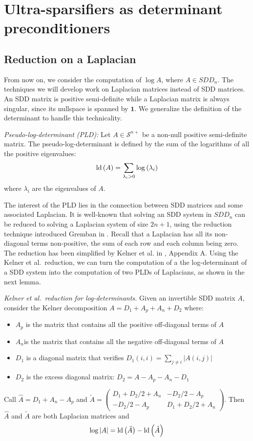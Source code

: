 
\section{Ultra-sparsifiers as determinant preconditioners}


\subsection{Reduction on a Laplacian}

\label{sec:Making-the-problem}

From now on, we consider the computation of $\log A$, where $A\in SDD_{n}$.
The techniques we will develop work on Laplacian matrices instead
of SDD matrices. An SDD matrix is positive semi-definite while a Laplacian
matrix is always singular, since its nullspace is spanned by $\mathbf{1}$.
We generalize the definition of the determinant to handle this technicality.
\begin{definition}
\emph{Pseudo-log-determinant (PLD):} Let $A\in\mathcal{S}^{n+}$ be
a non-null positive semi-definite matrix. The pseudo-log-determinant
is defined by the sum of the logarithms of all the positive eigenvalues:
\[
\text{\textnormal{ld}}\left(A\right)=\sum_{\lambda_{i}>0}\log\left(\lambda_{i}\right)
\]
where $\lambda_{i}$ are the eigenvalues of $A$. 
\end{definition}
The interest of the PLD lies in the connection between SDD matrices
and some associated Laplacian. It is well-known that solving an SDD
system in $SDD_{n}$ can be reduced to solving a Laplacian system
of size $2n+1$, using the reduction technique introduced Gremban
in \cite{Gremban1996}. Recall that a Laplacian has all its non-diagonal
terms non-positive, the sum of each row and each column being zero.
The reduction has been simplified by Kelner et al. in \cite{kelner2013simple},
Appendix A. Using the Kelner et al.\ reduction, we can turn the computation
of a the log-determinant of a SDD system into the computation of two
PLDs of Laplacians, as shown in the next lemma.
\begin{lemma}
\emph{Kelner et al.\ reduction for log-determinants. }Given an invertible
SDD matrix $A$, consider the Kelner decomposition $A=D_{1}+A_{p}+A_{n}+D_{2}$
where: 
\begin{itemize}
\item $A_{p}$ is the matrix that contains all the positive off-diagonal
terms of $A$ 
\item $A_{n}$is the matrix that contains all the negative off-diagonal
terms of $A$ 
\item $D_{1}$ is a diagonal matrix that verifies $D_{1}\left(i,i\right)=\sum_{j\neq i}\left|A\left(i,j\right)\right|$ 
\item $D_{2}$ is the excess diagonal matrix: $D_{2}=A-A_{p}-A_{n}-D_{1}$ 
\end{itemize}
Call $\hat{A}=D_{1}+A_{n}-A_{p}$ and $\tilde{A}=\left(\begin{array}{cc}
D_{1}+D_{2}/2+A_{n} & -D_{2}/2-A_{p}\\
-D_{2}/2-A_{p} & D_{1}+D_{2}/2+A_{n}
\end{array}\right)$. Then $\hat{A}$ and $\tilde{A}$ are both Laplacian matrices and
\[
\log\left|A\right|=\text{\textnormal{ld}}\left(\tilde{A}\right)-\text{\textnormal{ld}}\left(\hat{A}\right)
\]
\end{lemma}
